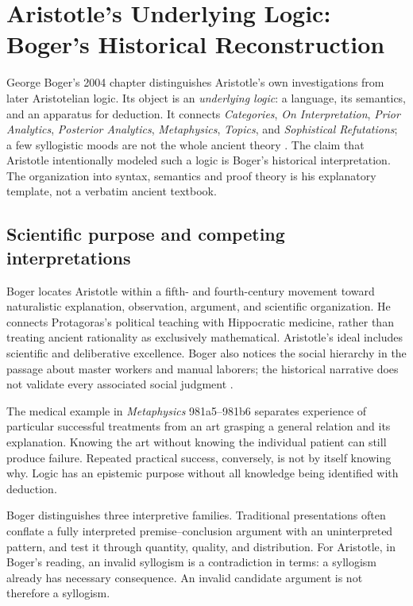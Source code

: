 \chapter{Aristotle's Underlying Logic: Boger's Historical Reconstruction}
\label{sec:p13-src063-0103}

George Boger's 2004 chapter distinguishes Aristotle's own investigations
from later Aristotelian logic. Its object is an \emph{underlying logic}: a
language, its semantics, and an apparatus for deduction. It connects
\emph{Categories}, \emph{On Interpretation}, \emph{Prior Analytics},
\emph{Posterior Analytics}, \emph{Metaphysics}, \emph{Topics}, and
\emph{Sophistical Refutations}; a few syllogistic moods are not the whole
ancient theory \parencite[pp.~101--118]{Boger2004UnderlyingLogic}.
The claim that Aristotle intentionally modeled such a logic is Boger's
historical interpretation. The organization into syntax, semantics and
proof theory is his explanatory template, not a verbatim ancient textbook.

\section{Scientific purpose and competing interpretations}
\label{sec:p13-boger-purpose}

Boger locates Aristotle within a fifth- and fourth-century movement toward
naturalistic explanation, observation, argument, and scientific organization.
He connects Protagoras's political teaching with Hippocratic medicine, rather
than treating ancient rationality as exclusively mathematical. Aristotle's
ideal includes scientific and deliberative excellence. Boger also notices
the social hierarchy in the passage about master workers and manual
laborers; the historical narrative does not validate every associated social
judgment \parencite[pp.~101--104]{Boger2004UnderlyingLogic}.

The medical example in \emph{Metaphysics} 981a5--981b6 separates experience
of particular successful treatments from an art grasping a general relation
and its explanation. Knowing the art without knowing the individual patient
can still produce failure. Repeated practical success, conversely, is not
by itself knowing why. Logic has an epistemic purpose without all knowledge
being identified with deduction.

Boger distinguishes three interpretive families. Traditional presentations
often conflate a fully interpreted premise--conclusion argument with an
uninterpreted pattern, and test it through quantity, quality, and
distribution. For Aristotle, in Boger's reading, an invalid syllogism is a
contradiction in terms: a syllogism already has necessary consequence.
An invalid candidate argument is not therefore a syllogism.

